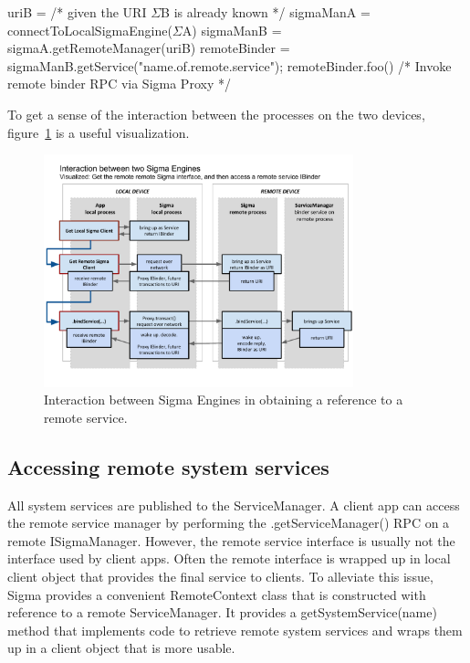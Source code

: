 \documentclass[prodmode]{acmlarge}
\begin{document}
\begin{snippet}
uriB = /* given the URI $\Sigma$B is already known */
sigmaManA = connectToLocalSigmaEngine($\Sigma$A)
sigmaManB = sigmaA.getRemoteManager(uriB)
remoteBinder = sigmaManB.getService("name.of.remote.service");
remoteBinder.foo() /* Invoke remote binder RPC via Sigma Proxy */
\end{snippet}

To get a sense of the interaction between the processes on the two devices, figure~\ref{fig:SigmaInteraction} is a useful visualization.

\begin{figure}[h]
\centering
\includegraphics[width=0.8\textwidth]{drawings/SigmaEngineInteraction.pdf}
\caption{Interaction between Sigma Engines in obtaining a reference to a remote service.}
\label{fig:SigmaInteraction}
\end{figure}

\subsection{Accessing remote system services}
All system services are published to the ServiceManager. A client app can access the remote service manager by performing the .getServiceManager() RPC on a remote ISigmaManager. However, the remote service interface is usually not the interface used by client apps. Often the remote interface is wrapped up in local client object that provides the final service to clients. To alleviate this issue, Sigma provides a convenient RemoteContext class that is constructed with reference to a remote ServiceManager. It provides a getSystemService(name) method that implements code to retrieve remote system services and wraps them up in a client object that is more usable.
\end{document}
